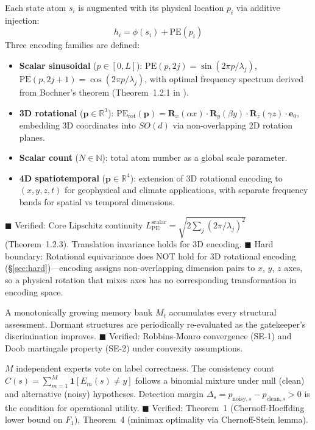 \documentclass[12pt,a4paper]{article}
\begin{document}
\begin{description}[leftmargin=2cm,style=nextline]
\item[\textbf{Layer 2 — Situs (Physical Positional Encoding)}.] Each state atom $s_i$ is augmented with its physical location $p_i$ via additive injection:
\begin{equation}
h_i = \phi(s_i) + \mathrm{PE}(p_i)
\label{eq:pe_injection}
\end{equation}
Three encoding families are defined:
\begin{itemize}[nosep]
\item \textbf{Scalar sinusoidal} ($p \in [0,L]$): $\mathrm{PE}(p, 2j) = \sin(2\pi p/\lambda_j)$, $\mathrm{PE}(p, 2j+1) = \cos(2\pi p/\lambda_j)$, with optimal frequency spectrum derived from Bochner's theorem (Theorem~1.2.1 in \cite{ppe_derivation}).
\item \textbf{3D rotational} ($\mathbf{p} \in \mathbb{R}^3$): $\mathrm{PE}_{\text{rot}}(\mathbf{p}) = \mathbf{R}_x(\alpha x) \cdot \mathbf{R}_y(\beta y) \cdot \mathbf{R}_z(\gamma z) \cdot \mathbf{e}_0$, embedding 3D coordinates into $SO(d)$ via non-overlapping 2D rotation planes.
\item \textbf{Scalar count} ($N \in \mathbb{N}$): total atom number as a global scale parameter.
\item \textbf{4D spatiotemporal} ($\mathbf{p} \in \mathbb{R}^4$): extension of 3D rotational encoding to $(x,y,z,t)$ for geophysical and climate applications, with separate frequency bands for spatial vs temporal dimensions.
\end{itemize}
\textcolor{verified}{$\blacksquare$ Verified}: Core Lipschitz continuity $L_{\mathrm{PE}}^{\text{scalar}} = \sqrt{2\sum_j (2\pi/\lambda_j)^2}$ (Theorem~1.2.3). Translation invariance holds for 3D encoding. \textcolor{warning}{$\blacksquare$ Hard boundary}: Rotational equivariance does NOT hold for 3D rotational encoding (\S\ref{sec:hard})---encoding assigns non-overlapping dimension pairs to $x$, $y$, $z$ axes, so a physical rotation that mixes axes has no corresponding transformation in encoding space.

\item[\textbf{Layer 3 — Spring (Self-Evolution)}.] A monotonically growing memory bank $M_t$ accumulates every structural assessment. Dormant structures are periodically re-evaluated as the gatekeeper's discrimination improves. \textcolor{verified}{$\blacksquare$ Verified}: Robbins-Monro convergence (SE-1) and Doob martingale property (SE-2) under convexity assumptions.

\item[\textbf{Layer 4 — Yajie (Multi-Expert Audit)}.] $M$ independent experts vote on label correctness. The consistency count $C(s) = \sum_{m=1}^{M} \mathbf{1}[E_m(s) \neq y]$ follows a binomial mixture under null (clean) and alternative (noisy) hypotheses. Detection margin $\Delta_s = p_{\text{noisy},s} - p_{\text{clean},s} > 0$ is the condition for operational utility. \textcolor{verified}{$\blacksquare$ Verified}: Theorem~1 (Chernoff-Hoeffding lower bound on $F_1$), Theorem~4 (minimax optimality via Chernoff-Stein lemma).


\end{description}
\end{document}
